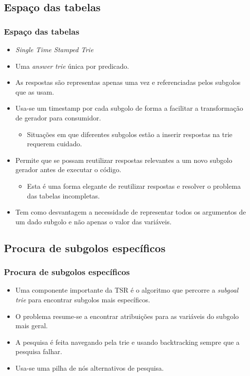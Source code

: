 \documentclass{beamer}
\begin{document}
\subsection{Espaço das tabelas}
\begin{frame}
   \frametitle{Espaço das tabelas}
   \begin{itemize}
      \item \emph{Single Time Stamped Trie}
      \item Uma \emph{answer trie} única por predicado.
      \pause
      \item As respostas são representas apenas uma vez e referenciadas pelos subgolos que as usam.
      \item Usa-se um timestamp por cada subgolo de forma a facilitar a transformação de gerador para consumidor.
      \begin{itemize}
         \item Situações em que diferentes subgolos estão a inserir respostas na trie requerem cuidado.
      \end{itemize}
      \pause
      \item Permite que se possam reutilizar respostas relevantes a um novo subgolo gerador antes de executar
      o código.
      \begin{itemize}
         \item Esta é uma forma elegante de reutilizar respostas e resolver o problema das tabelas incompletas.
      \end{itemize}
      \pause
      \item Tem como desvantagem a necessidade de representar todos os argumentos de um dado subgolo e não
      apenas o valor das variáveis.
   \end{itemize}
\end{frame}

\subsection{Procura de subgolos específicos}
\begin{frame}
   \frametitle{Procura de subgolos específicos}
   \begin{itemize}
      \item Uma componente importante da TSR é o algoritmo que percorre a \emph{subgoal trie} para
      encontrar subgolos mais específicos.
      \pause
      \item O problema resume-se a encontrar atribuições para as variáveis do subgolo mais geral.
      \pause
      \item A pesquisa é feita navegando pela trie e usando backtracking sempre que a pesquisa falhar.
      \item Usa-se uma pilha de nós alternativos de pesquisa.
   \end{itemize}
\end{frame}
\end{document}
